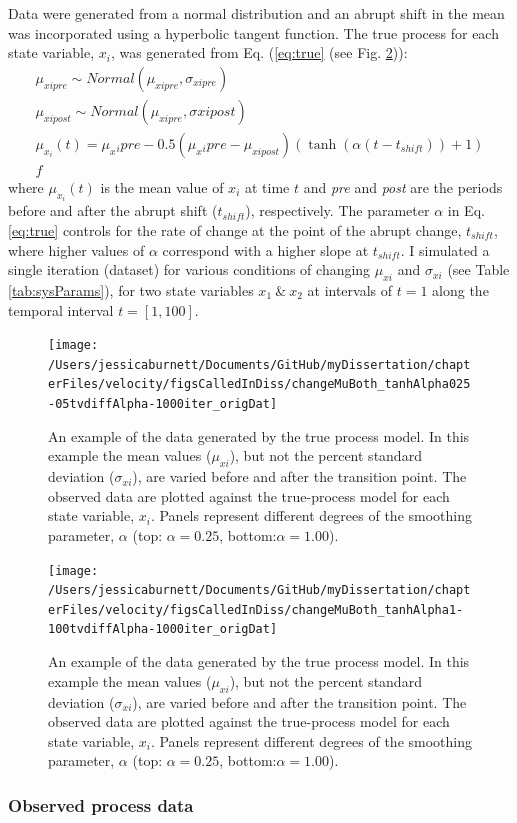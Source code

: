 \documentclass[12pt,twoside,openany]{reedthesis}
\begin{document}
Data were generated from a normal distribution and an abrupt shift in the mean was incorporated using a hyperbolic tangent function. The true process for each state variable, \(x_i\), was generated from Eq. (\eqref{eq:true} (see Fig. \ref{fig:trueObsEx})):
\begin{equation}
\begin{array}{rcr}
\mu_{xipre}\sim Normal(\mu_{xipre},\sigma_{xipre}) \\ 
\mu_{xipost} \sim Normal(\mu_{xipre}, \sigma{xipost}) \\ 
\mu_{x_i}(t) = \mu_x{_ipre}  - 0.5(\mu_x{_ipre}-\mu_{xipost})(\tanh(\alpha (t-t_{shift}))+1) \\ f
\end{array}
\label{eq:true}
\end{equation}
where \(\mu_{x_i}(t)\) is the mean value of \(x_i\) at time \(t\) and \emph{pre} and \emph{post} are the periods before and after the abrupt shift (\(t_{shift}\)), respectively. The parameter \(\alpha\) in Eq. \eqref{eq:true} controls for the rate of change at the point of the abrupt change, \(t_{shift}\), where higher values of \(\alpha\) correspond with a higher slope at \(t_{shift}\). I simulated a single iteration (dataset) for various conditions of changing \(\mu_{xi}\) and \(\sigma_{xi}\) (see Table \ref{tab:sysParams}), for two state variables \(x_1\ \&\ x_2\) at intervals of \(t=1\) along the temporal interval \(t=[1,100]\).
\begin{figure}
\texttt{[image: /Users/jessicaburnett/Documents/GitHub/myDissertation/chapterFiles/velocity/figsCalledInDiss/changeMuBoth\_tanhAlpha025-05tvdiffAlpha-1000iter\_origDat]} \caption{An example of the data generated by the true process model. In this example the mean values ($\mu_{xi}$), but not the percent standard deviation ($\sigma_{xi}$), are varied before and after the transition point. The observed data are plotted against the true-process model for each state variable, $x_i$. Panels represent different degrees of the smoothing parameter, $\alpha$ (top: $\alpha=0.25$, bottom:$\alpha=1.00$).}\label{fig:trueObsEx}
\end{figure}
\begin{figure}
\texttt{[image: /Users/jessicaburnett/Documents/GitHub/myDissertation/chapterFiles/velocity/figsCalledInDiss/changeMuBoth\_tanhAlpha1-100tvdiffAlpha-1000iter\_origDat]} \caption{An example of the data generated by the true process model. In this example the mean values ($\mu_{xi}$), but not the percent standard deviation ($\sigma_{xi}$), are varied before and after the transition point. The observed data are plotted against the true-process model for each state variable, $x_i$. Panels represent different degrees of the smoothing parameter, $\alpha$ (top: $\alpha=0.25$, bottom:$\alpha=1.00$).}\label{fig:trueObsEx}
\end{figure}
\hypertarget{observed-process-data}{%
\subsubsection{Observed process data}\label{observed-process-data}}
\end{document}
